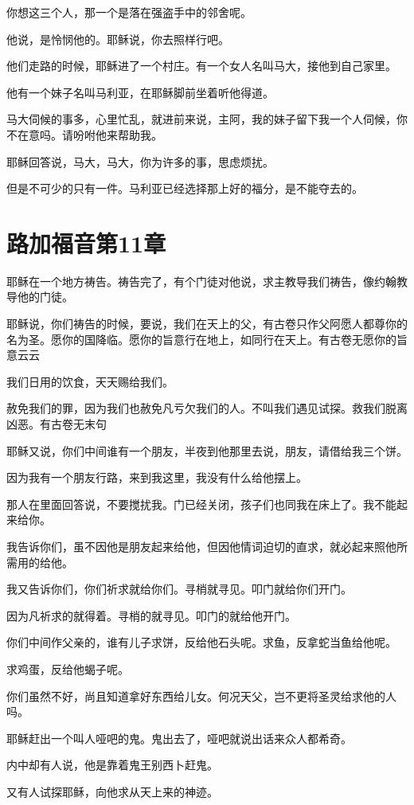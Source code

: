 \documentclass[12pt,oneside]{book}
\begin{document}
你想这三个人，那一个是落在强盗手中的邻舍呢。

他说，是怜悯他的。耶稣说，你去照样行吧。

他们走路的时候，耶稣进了一个村庄。有一个女人名叫马大，接他到自己家里。

他有一个妹子名叫马利亚，在耶稣脚前坐着听他得道。

马大伺候的事多，心里忙乱，就进前来说，主阿，我的妹子留下我一个人伺候，你不在意吗。请吩咐他来帮助我。

耶稣回答说，马大，马大，你为许多的事，思虑烦扰。

但是不可少的只有一件。马利亚已经选择那上好的福分，是不能夺去的。

\chapter{路加福音第11章}
耶稣在一个地方祷告。祷告完了，有个门徒对他说，求主教导我们祷告，像约翰教导他的门徒。

耶稣说，你们祷告的时候，要说，我们在天上的父，有古卷只作父阿愿人都尊你的名为圣。愿你的国降临。愿你的旨意行在地上，如同行在天上。有古卷无愿你的旨意云云

我们日用的饮食，天天赐给我们。

赦免我们的罪，因为我们也赦免凡亏欠我们的人。不叫我们遇见试探。救我们脱离凶恶。有古卷无末句

耶稣又说，你们中间谁有一个朋友，半夜到他那里去说，朋友，请借给我三个饼。

因为我有一个朋友行路，来到我这里，我没有什么给他摆上。

那人在里面回答说，不要搅扰我。门已经关闭，孩子们也同我在床上了。我不能起来给你。

我告诉你们，虽不因他是朋友起来给他，但因他情词迫切的直求，就必起来照他所需用的给他。

我又告诉你们，你们祈求就给你们。寻梢就寻见。叩门就给你们开门。

因为凡祈求的就得着。寻梢的就寻见。叩门的就给他开门。

你们中间作父亲的，谁有儿子求饼，反给他石头呢。求鱼，反拿蛇当鱼给他呢。

求鸡蛋，反给他蝎子呢。

你们虽然不好，尚且知道拿好东西给儿女。何况天父，岂不更将圣灵给求他的人吗。

耶稣赶出一个叫人哑吧的鬼。鬼出去了，哑吧就说出话来众人都希奇。

内中却有人说，他是靠着鬼王别西卜赶鬼。

又有人试探耶稣，向他求从天上来的神迹。
\end{document}
